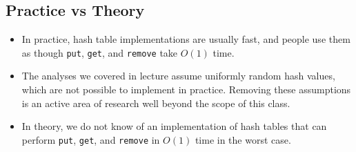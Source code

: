 \documentclass[12pt]{article}
\newcommand{\1}{\space \quad}
\newcommand{\2}{\quad \quad \quad}
\newcommand{\3}{\quad \quad \quad \quad \space}
\newcommand{\4}{\quad \quad \quad \quad \quad \quad}
\begin{document}
\subsection{Practice vs Theory}
\begin{itemize}
\item In practice, hash table implementations are usually fast, and people use them as though \texttt{put}, \texttt{get}, and \texttt{remove} take $O(1)$ time.
\item The analyses we covered in lecture assume uniformly random hash values, which are not possible to implement in practice. Removing these assumptions is an active area of research well beyond the scope of this class.
\item In theory, we do not know of an implementation of hash tables that can perform \texttt{put}, \texttt{get}, and \texttt{remove} in $O(1)$ time in the worst case.
\end{itemize}
\end{document}

